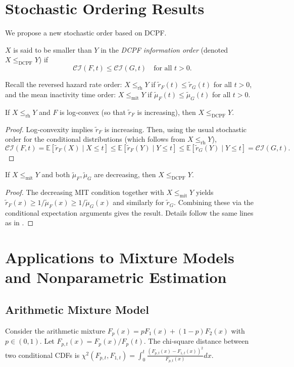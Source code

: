 \documentclass[twoside]{article}
\begin{document}
\section{Stochastic Ordering Results}\label{st}

We propose a new stochastic order based on DCPF.

\begin{dfn}
	$X$ is said to be smaller than $Y$ in the \emph{DCPF information order} (denoted $X\le_{\text{DCPF}} Y$) if
	\[
	\mathcal{CI}(F,t)\le \mathcal{CI}(G,t)\quad\text{for all } t>0. \tag{13}
	\]
\end{dfn}
Recall the reversed hazard rate order: $X\le_{\text{rh}} Y$ if $\tilde{r}_F(t)\le\tilde{r}_G(t)$ for all $t>0$, and the mean inactivity time order: $X\le_{\text{mit}} Y$ if $\tilde{\mu}_F(t)\le\tilde{\mu}_G(t)$ for all $t>0$.

\begin{thm}
	If $X\le_{\text{rh}} Y$ and $F$ is log‑convex (so that $\tilde{r}_F$ is increasing), then $X\le_{\text{DCPF}} Y$.
\end{thm}
\begin{proof}
	Log‑convexity implies $\tilde{r}_F$ is increasing. Then, using the usual stochastic order for the conditional distributions (which follows from $X\le_{\text{rh}}Y$),
	\[
	\mathcal{CI}(F,t)=\mathbb{E}[\tilde{r}_F(X)\mid X\le t]\le \mathbb{E}[\tilde{r}_F(Y)\mid Y\le t]\le \mathbb{E}[\tilde{r}_G(Y)\mid Y\le t]=\mathcal{CI}(G,t).
	\]
\end{proof}
\begin{thm}
	If $X\le_{\text{mit}} Y$ and both $\tilde{\mu}_F,\tilde{\mu}_G$ are decreasing, then $X\le_{\text{DCPF}} Y$.
\end{thm}
\begin{proof}
	The decreasing MIT condition together with $X\le_{\text{mit}}Y$ yields $\tilde{r}_F(x)\ge 1/\tilde{\mu}_F(x)\ge 1/\tilde{\mu}_G(x)$ and similarly for $\tilde{r}_G$. Combining these via the conditional expectation arguments gives the result. Details follow the same lines as in \cite{balakrishnan2022cumulative}.
\end{proof}
\section{Applications to Mixture Models and Nonparametric Estimation}\label{mix}

\subsection{Arithmetic Mixture Model}
Consider the arithmetic mixture $F_p(x)=pF_1(x)+(1-p)F_2(x)$ with $p\in(0,1)$. Let $F_{p,t}(x)=F_p(x)/F_p(t)$. The chi‑square distance between two conditional CDFs is $\chi^2(F_{p,t},F_{1,t})=\int_0^t \frac{(F_{p,t}(x)-F_{1,t}(x))^2}{F_{p,t}(x)}dx$.
\end{document}
